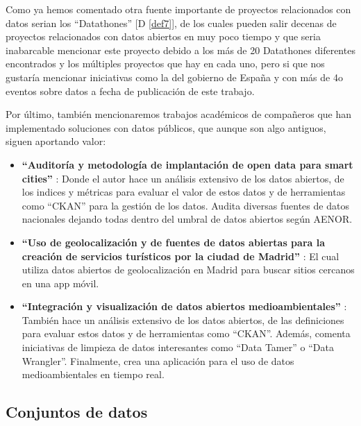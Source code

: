 	Como ya hemos comentado otra fuente importante de proyectos relacionados con datos serian los ``Datathones'' [D \ref{def7}], de los cuales pueden salir decenas de proyectos relacionados con datos abiertos en muy poco tiempo y que seria inabarcable mencionar este proyecto debido a los más de 20 Datathones diferentes encontrados y los múltiples proyectos que hay en cada uno, pero si que nos gustaría mencionar iniciativas como la del gobierno de España \citep{EventosDatosAbiertosGOB} y \citep{EventosDatathonGOB} con más de 4o eventos sobre datos a fecha de publicación de este trabajo.
	
	Por último, también mencionaremos trabajos académicos de compañeros que han implementado soluciones con datos públicos, que aunque son algo antiguos, siguen aportando valor:
	
	\begin{itemize}
			\item \textbf{``Auditoría y metodología de implantación de open data para smart cities''} \citep{MelendrezMoreto2016Auditoria}: Donde el autor hace un análisis extensivo de los datos abiertos, de los indices y métricas para evaluar el valor de estos datos y de herramientas como ``CKAN'' para la gestión de los datos. Audita diversas fuentes de datos nacionales dejando todas dentro del umbral de datos abiertos según AENOR. 
			
			\item \textbf{``Uso de geolocalización y de fuentes de datos abiertas para la creación de servicios turísticos por la ciudad de Madrid''} \citep{LLamoccaPortela2016Integracion}: El cual utiliza datos abiertos de geolocalización en Madrid para buscar sitios cercanos en una app móvil.
			
			\item \textbf{``Integración y visualización de datos abiertos medioambientales''} \citep{ArellanoBruno2019UsoDeGeolocalizacion}: También hace un análisis extensivo de los datos abiertos, de las definiciones para evaluar estos datos y de herramientas como ``CKAN''. Además, comenta iniciativas de limpieza de datos interesantes como ``Data Tamer'' o ``Data Wrangler''. Finalmente, crea una aplicación para el uso de datos medioambientales en tiempo real.
	\end{itemize}
	
	\subsection{Conjuntos de datos}
	
